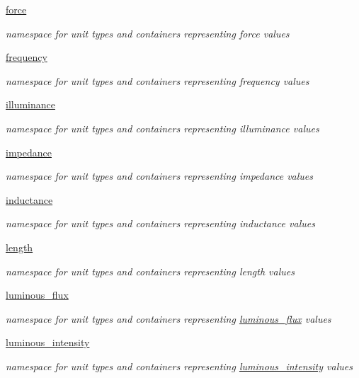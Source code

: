 \begin{DoxyCompactItemize}
 \hyperlink{namespaceunits_1_1force}{force}
\begin{DoxyCompactList}\small\item\em namespace for unit types and containers representing force values \end{DoxyCompactList}\item 
 \hyperlink{namespaceunits_1_1frequency}{frequency}
\begin{DoxyCompactList}\small\item\em namespace for unit types and containers representing frequency values \end{DoxyCompactList}\item 
 \hyperlink{namespaceunits_1_1illuminance}{illuminance}
\begin{DoxyCompactList}\small\item\em namespace for unit types and containers representing illuminance values \end{DoxyCompactList}\item 
 \hyperlink{namespaceunits_1_1impedance}{impedance}
\begin{DoxyCompactList}\small\item\em namespace for unit types and containers representing impedance values \end{DoxyCompactList}\item 
 \hyperlink{namespaceunits_1_1inductance}{inductance}
\begin{DoxyCompactList}\small\item\em namespace for unit types and containers representing inductance values \end{DoxyCompactList}\item 
 \hyperlink{namespaceunits_1_1length}{length}
\begin{DoxyCompactList}\small\item\em namespace for unit types and containers representing length values \end{DoxyCompactList}\item 
 \hyperlink{namespaceunits_1_1luminous__flux}{luminous\+\_\+flux}
\begin{DoxyCompactList}\small\item\em namespace for unit types and containers representing \hyperlink{namespaceunits_1_1luminous__flux}{luminous\+\_\+flux} values \end{DoxyCompactList}\item 
 \hyperlink{namespaceunits_1_1luminous__intensity}{luminous\+\_\+intensity}
\begin{DoxyCompactList}\small\item\em namespace for unit types and containers representing \hyperlink{namespaceunits_1_1luminous__intensity}{luminous\+\_\+intensity} values \end{DoxyCompactList}\item 

\end{DoxyCompactItemize}
